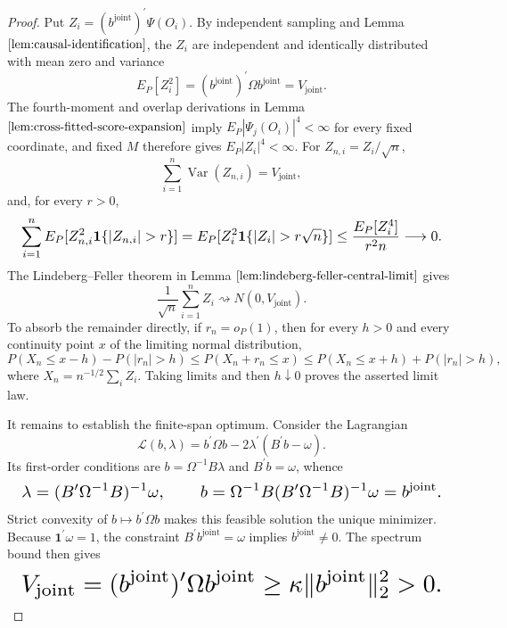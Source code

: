 \documentclass{article}
\begin{document}
\begin{proof}
Put \(Z_i=(b^{\mathrm{joint}})^{\prime}\Psi(O_i)\). By independent sampling and Lemma \(\ref{lem:causal-identification}\), the \(Z_i\) are independent and identically distributed with mean zero and variance
\[
E_P[Z_i^2]=(b^{\mathrm{joint}})^{\prime}\Omega b^{\mathrm{joint}}=V_{\mathrm{joint}}.
\]
The fourth-moment and overlap derivations in Lemma \(\ref{lem:cross-fitted-score-expansion}\) imply \(E_P|\Psi_j(O_i)|^4<\infty\) for every fixed coordinate, and fixed \(M\) therefore gives \(E_P|Z_i|^4<\infty\). For \(Z_{n,i}=Z_i/\sqrt n\),
\[
\sum_{i=1}^n\operatorname{Var}(Z_{n,i})=V_{\mathrm{joint}},
\]
and, for every \(r>0\),
\[
\makebox[\linewidth][c]{\resizebox{0.98\linewidth}{!}{\(\displaystyle \sum_{i=1}^nE_P[Z_{n,i}^2\mathbf 1\{|Z_{n,i}|>r\}]
=E_P[Z_i^2\mathbf 1\{|Z_i|>r\sqrt n\}]
\le\frac{E_P[Z_i^4]}{r^2n}\longrightarrow0.\)}}
\]
The Lindeberg--Feller theorem in Lemma \(\ref{lem:lindeberg-feller-central-limit}\) gives
\[
\frac1{\sqrt n}\sum_{i=1}^nZ_i\rightsquigarrow N(0,V_{\mathrm{joint}}).
\]
To absorb the remainder directly, if \(r_n=o_P(1)\), then for every \(h>0\) and every continuity point \(x\) of the limiting normal distribution,
\[
P(X_n\le x-h)-P(|r_n|>h)
\le P(X_n+r_n\le x)
\le P(X_n\le x+h)+P(|r_n|>h),
\]
where \(X_n=n^{-1/2}\sum_iZ_i\). Taking limits and then \(h\downarrow0\) proves the asserted limit law.

It remains to establish the finite-span optimum. Consider the Lagrangian
\[
\mathcal L(b,\lambda)=b^{\prime}\Omega b
-2\lambda^{\prime}(B^{\prime}b-\omega).
\]
Its first-order conditions are \(b=\Omega^{-1}B\lambda\) and \(B^{\prime}b=\omega\), whence
\[
\makebox[\linewidth][c]{\resizebox{0.98\linewidth}{!}{\(\displaystyle \lambda=(B^{\prime}\Omega^{-1}B)^{-1}\omega,
\qquad
b=\Omega^{-1}B(B^{\prime}\Omega^{-1}B)^{-1}\omega
=b^{\mathrm{joint}}.\)}}
\]
Strict convexity of \(b\mapsto b^{\prime}\Omega b\) makes this feasible solution the unique minimizer. Because \(\mathbf 1^{\prime}\omega=1\), the constraint \(B^{\prime}b^{\mathrm{joint}}=\omega\) implies \(b^{\mathrm{joint}}\ne0\). The spectrum bound then gives
\[
\makebox[\linewidth][c]{\resizebox{0.98\linewidth}{!}{\(\displaystyle V_{\mathrm{joint}}
=(b^{\mathrm{joint}})^{\prime}\Omega b^{\mathrm{joint}}
\ge\kappa\|b^{\mathrm{joint}}\|_2^2>0.\)}}
\]


\end{proof}
\end{document}
